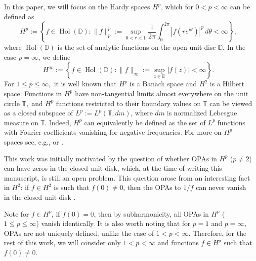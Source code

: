 \documentclass{article}
\theoremstyle{plain}
\numberwithin{Theorem}{section}
\numberwithin{equation}{section}
\theoremstyle{plain}
\theoremstyle{definition}
\renewcommand{\leq}{\leqslant}
\newcommand{\D}{\mathbb{D}}
\newcommand{\T}{\mathbb{T}}
\begin{document}
In this paper, we will focus on the Hardy spaces $H^p$, which for $ 0 < p < \infty$ can be defined as
\[
H^p:= \left\{ f \in \operatorname{Hol}(\D) :  \|f\|_p^p := \sup_{0 < r < 1} \frac{1}{2\pi} \int_0^{2 \pi} |f(r e^{i \theta})|^p  \, d \theta < \infty \right\},
\]
where $\operatorname{Hol}(\D)$ is the set of analytic functions on the open unit disc $\D$.
In the case $p = \infty$, we define
\[
H^{\infty}:= \left\{ f\in\operatorname{Hol}(\D) : \|f\|_{\infty} := \sup_{z \in \D} \left|f(z)\right| < \infty \right\}.
\]
For $ 1 \leq p \leq \infty,$ it is well known that $H^p$ is a Banach space and $H^2$ is a Hilbert space. Functions in $H^p$ have non-tangential limits almost everywhere on the unit circle $\T,$ and $H^p$ functions restricted to their boundary values on $\T$ can be viewed as a closed subspace of $L^p:=L^p(\T, dm)$, where $dm$ is normalized Lebesgue measure on $\T$. Indeed, $H^p$ can equivalently be defined as the set of $L^p$ functions with Fourier coefficients vanishing for negative frequencies.  For more on $H^p$ spaces see, e.g., \cite{Duren} or \cite{MR0133008}. 

This work was initially motivated by the question of whether OPAs in $H^p$ ($p \neq 2$) can have zeros in the closed unit disk, which, at the time of writing this manuscript, is still an open problem. 
This question arose from an interesting fact in $H^2$: if $f \in H^2$ is such that $f(0) \neq 0$, then the OPAs to $1/f$ can never vanish in the closed unit disk \cite{BKLSS_Lon,Chu1}. 

Note for $f \in H^p$, if $f(0) = 0$, then by subharmonicity, all OPAs in $H^p$ ($1 \leq p \leq \infty$) vanish identically. It is also worth noting that for $p = 1$ and $p = \infty,$ OPAs are not uniquely defined, unlike the case of $1<p<\infty$.  Therefore, for the rest of this work, we will consider only $ 1 < p < \infty$ and functions $f \in H^p$ such that $f(0) \neq 0$.
\end{document}
